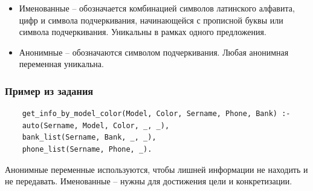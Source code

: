 \documentclass[a4paper,12pt]{article}
\begin{document}
	\begin{itemize}
		\item Именованные – обозначается комбинацией символов латинского алфавита,
		цифр и символа подчеркивания, начинающейся с прописной буквы или
		символа подчеркивания. Уникальны в рамках одного предложения.
		\item Анонимные – обозначаются символом подчеркивания. Любая анонимная
		переменная уникальна.
	\end{itemize}

	\subsubsection*{Пример из задания}
	
	\begin{verbatim}
	get_info_by_model_color(Model, Color, Sername, Phone, Bank) :-
	auto(Sername, Model, Color, _, _), 
	bank_list(Sername, Bank, _, _),
	phone_list(Sername, Phone, _).
	\end{verbatim}
	
	Анонимные переменные используются, чтобы лишней информации не находить и не передавать. Именованные – нужны для достижения цели и конкретизации.
	
\end{document}
